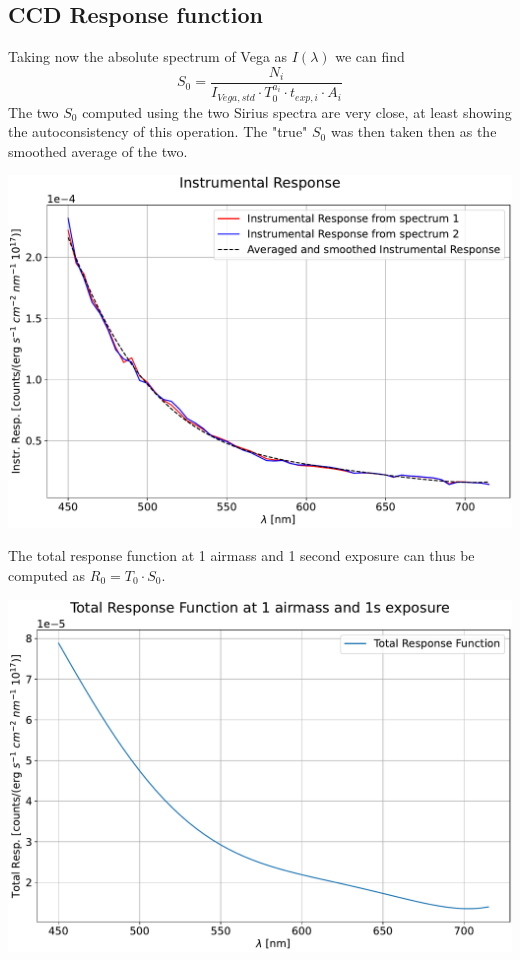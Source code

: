 \documentclass[a4paper]{article}
\newenvironment{Figure}
	{\par\medskip\noindent\minipage{\linewidth}}
	{\endminipage\par\medskip}
\begin{document}
\begin{multicols}{2}
		\subsection{CCD Response function}
			Taking now the absolute spectrum of Vega as $I(\lambda)$ we can find
			\begin{equation*}
				S_0 = \frac{N_i}{I_{Vega,std} \cdot T_0^{a_i} \cdot t_{exp,i} \cdot A_i}
			\end{equation*}
			The two $S_0$ computed using the two Sirius spectra are very close, at least showing the autoconsistency of this operation. The "true" $S_0$ was then taken then as the smoothed average of the two.
			\begin{Figure}
				\centering
				\includegraphics[width=\linewidth]{Instr_resp.pdf}
				\label{fig:instr_re}
			\end{Figure}
			
			\vspace{0.01\textheight}
			
			The total response function at 1 airmass and 1 second exposure can thus be computed as $R_0 = T_0 \cdot S_0$.
			\begin{Figure}
				\centering
				\includegraphics[width=\linewidth]{Tot_resp.pdf}
				\label{fig:resp_tot}
			\end{Figure}
		

\end{multicols}
\end{document}
